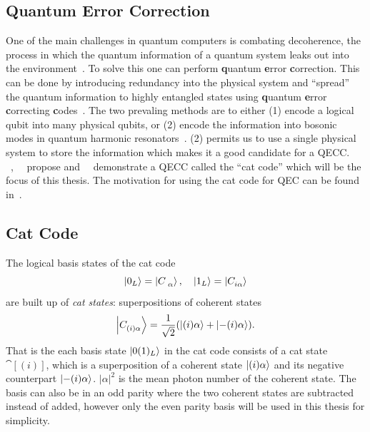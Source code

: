\documentclass[main.tex]{subfiles}
\begin{document}
\subsection{Quantum Error Correction}
One of the main challenges in quantum computers is combating decoherence, the process in which the quantum information of a quantum system leaks out into the environment~\cite{gottesman_introduction_2009}.
To solve this one can perform \textbf{q}uantum \textbf{e}rror \textbf{c}orrection.
This can be done by introducing redundancy into the physical system and ``spread'' the quantum information to highly entangled states using \textbf{q}uantum \textbf{e}rror \textbf{c}orrecting \textbf{c}odes~\cite{gottesman_introduction_2009}.
The two prevaling methods are to either (1) encode a logical qubit into many physical qubits, or (2) encode the information into bosonic modes in quantum harmonic resonators~\cite{}.
(2) permits us to use a single physical system to store the information which makes it a good candidate for a QECC.
\citeauthor{leghtas_hardware-efficient_2013}~\cite{leghtas_hardware-efficient_2013},~\citeauthor{mirrahimi_dynamically_2014}~\cite{mirrahimi_dynamically_2014} propose and~\citeauthor{ofek_extending_2016}~\cite{ofek_extending_2016} demonstrate a QECC called the ``cat code'' which will be the focus of this thesis. The motivation for using the cat code for QEC can be found in~\cite{ofek_extending_2016}.

\subsection{Cat Code}%
\label{sec:cat-code}
The logical basis states of the cat code
\begin{equation}
    \ket{0_L} = \cat{},\quad \ket{1_L} = \cat[i]{}
\end{equation}
are built up of \emph{cat states}: superpositions of coherent states
\begin{equation}
    \cat[(i)]{} = \frac{1}{\sqrt{2}}\qty(\ket{(i)\alpha} + \ket{-(i)\alpha}).
\end{equation}
That is the each basis state \( \ket{0(1)_L} \) in the cat code consists of a cat state \(\cat[(i)]{}\), which is a superposition of a coherent state \(\ket{(i)\alpha}\) and its negative counterpart \(\ket{-(i)\alpha}\). \(|\alpha|^2\) is the mean photon number of the coherent state.
The basis can also be in an odd parity where the two coherent states are subtracted instead of added, however only the even parity basis will be used in this thesis for simplicity.
\end{document}

